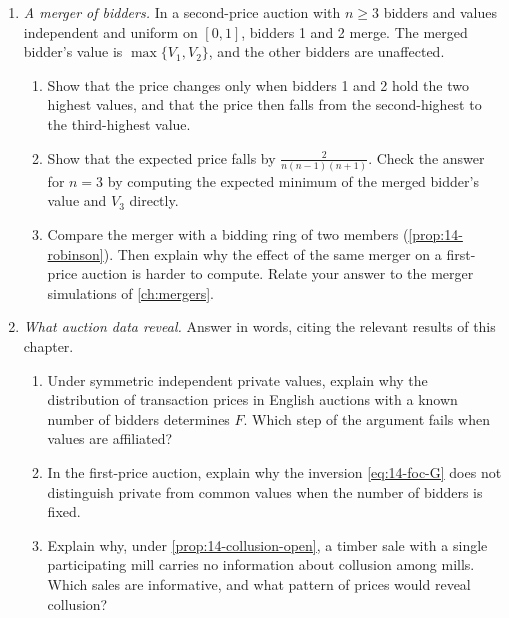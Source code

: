 \begin{enumerate}[label=\arabic*., leftmargin=*, itemsep=6pt]
\item \textit{A merger of bidders.} In a second-price auction with $n\ge 3$ bidders and values independent and
uniform on $[0,1]$, bidders 1 and 2 merge. The merged bidder's value is $\max\{V_1,V_2\}$, and the other
bidders are unaffected.
\begin{enumerate}[label=(\alph*)]
  \item Show that the price changes only when bidders 1 and 2 hold the two highest values, and that the price
  then falls from the second-highest to the third-highest value.
  \item Show that the expected price falls by $\frac{2}{n(n-1)(n+1)}$. Check the answer for $n=3$ by computing
  the expected minimum of the merged bidder's value and $V_3$ directly.
  \item Compare the merger with a bidding ring of two members (\cref{prop:14-robinson}). Then explain why the
  effect of the same merger on a first-price auction is harder to compute. Relate your answer to the merger
  simulations of \cref{ch:mergers}.
\end{enumerate}

\item \textit{What auction data reveal.} Answer in words, citing the relevant results of this chapter.
\begin{enumerate}[label=(\alph*)]
  \item Under symmetric independent private values, explain why the distribution of transaction prices in
  English auctions with a known number of bidders determines $F$. Which step of the argument fails when values
  are affiliated?
  \item In the first-price auction, explain why the inversion \eqref{eq:14-foc-G} does not distinguish private
  from common values when the number of bidders is fixed.
  \item Explain why, under \cref{prop:14-collusion-open}, a timber sale with a single participating mill carries
  no information about collusion among mills. Which sales are informative, and what pattern of prices would
  reveal collusion?
\end{enumerate}


\end{enumerate}
